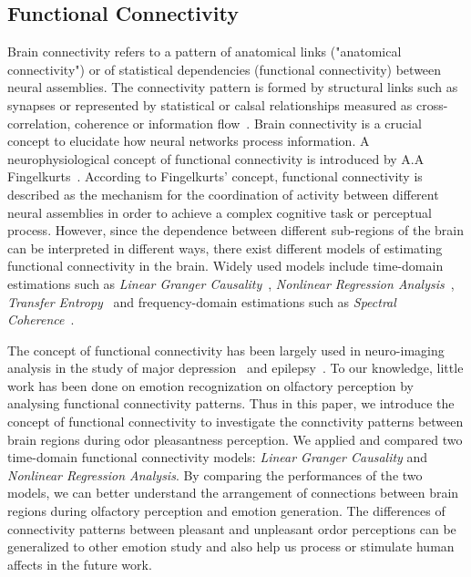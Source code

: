\subsection{Functional Connectivity}
Brain connectivity refers to a pattern of anatomical links ("anatomical connectivity") or of statistical dependencies (functional connectivity) between neural assemblies. The connectivity pattern is formed by structural links such as synapses or represented by statistical or calsal relationships measured as cross-correlation, coherence or information flow~\cite{sporns2007brain}. Brain connectivity is a crucial concept to elucidate how neural networks process information. 
A neurophysiological concept of functional connectivity is introduced by A.A Fingelkurts~\cite{fingelkurts2005functional}. According to Fingelkurts' concept, functional connectivity is described as the mechanism for the coordination of activity between different neural assemblies in order to achieve a complex cognitive task or perceptual process. However, since the dependence between different sub-regions of the brain can be interpreted in different ways, there exist different models of estimating functional connectivity in the brain. Widely used models include time-domain estimations such as \emph{Linear Granger Causality}~\cite{granger1969investigating}, \emph{Nonlinear Regression Analysis}~\cite{pijn1990localization}, \emph{Transfer Entropy}~\cite{schreiber2000measuring} and frequency-domain estimations such as \emph{Spectral Coherence}~\cite{sun2004measuring}.

The concept of functional connectivity has been largely used in neuro-imaging analysis in the study of major depression~\cite{greicius2007resting} and epilepsy~\cite{waites2006functional}. To our knowledge, little work has been done on emotion recognization on olfactory perception by analysing functional connectivity patterns. Thus in this paper, we introduce the concept of functional connectivity to investigate the connctivity patterns between brain regions during odor pleasantness perception. We applied and compared two time-domain functional connectivity models: \emph{Linear Granger Causality} and \emph{Nonlinear Regression Analysis}. By comparing the performances of the two models, we can better understand the arrangement of connections between brain regions during olfactory perception and emotion generation. The differences of connectivity patterns between pleasant and unpleasant ordor perceptions can be generalized to other emotion study and also help us process or stimulate human affects in the future work. 

